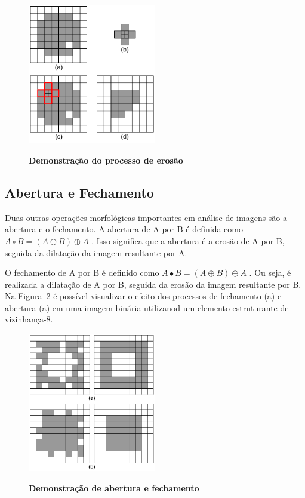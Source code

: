 \documentclass[12pt,oneside,a4paper,english,french,spanish,brazil,]{abntex2}
\begin{document}
\begin{figure}[ht]
\centering
\caption{\textbf{Demonstração do processo de erosão}}
\includegraphics[width=0.5\textwidth]{imagens/PDI_Erosao_1.pdf}
\sourceAuthor
\label{fig:PDI_Erosao_1}
\end{figure}

\subsection{Abertura e Fechamento}

Duas outras operações morfológicas importantes em análise de imagens são a abertura e o fechamento. A abertura de A por B é definida como \(A \circ  B = (A \ominus B) \oplus A\) \cite{pedrini:2008}. Isso significa que a abertura é a erosão de A por B, seguida da dilatação da imagem resultante por A.

O fechamento de A por B é definido como \(A \bullet  B = (A \oplus B) \ominus A\) \cite{pedrini:2008}. Ou seja, é realizada a dilatação de A por B, seguida da erosão da imagem resultante por B.
Na Figura~\ref{fig:PDI_Abertura_Fechamento_1} é possível visualizar o efeito dos processos de fechamento (a) e abertura (a) em uma imagem binária utilizanod um elemento estruturante de vizinhança-8.

\begin{figure}[ht]
\centering
\caption{\textbf{Demonstração de abertura e fechamento}}
\includegraphics[width=0.5\textwidth]{imagens/PDI_Abertura_Fechamento_1.pdf}
\sourceAuthor
\label{fig:PDI_Abertura_Fechamento_1}
\end{figure}
\end{document}
